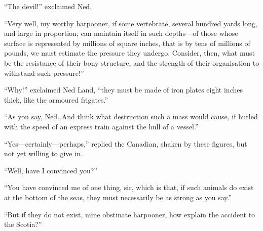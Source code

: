 ``The devil!'' exclaimed Ned.

``Very well, my worthy harpooner, if some vertebrate, several hundred
yards long, and large in proportion, can maintain itself in such depths---of
those whose surface is represented by millions of square inches, that is
by tens of millions of pounds, we must estimate the pressure they undergo.
Consider, then, what must be the resistance of their bony structure,
and the strength of their organisation to withstand such pressure!''

``Why!'' exclaimed Ned Land, ``they must be made of iron plates
eight inches thick, like the armoured frigates.''

``As you say, Ned.  And think what destruction such a mass would cause,
if hurled with the speed of an express train against the hull of a vessel.''

``Yes---certainly---perhaps,'' replied the Canadian, shaken by these figures,
but not yet willing to give in.

``Well, have I convinced you?''

``You have convinced me of one thing, sir, which is that,
if such animals do exist at the bottom of the seas, they must
necessarily be as strong as you say.''

``But if they do not exist, mine obstinate harpooner, how explain
the accident to the Scotia?''
